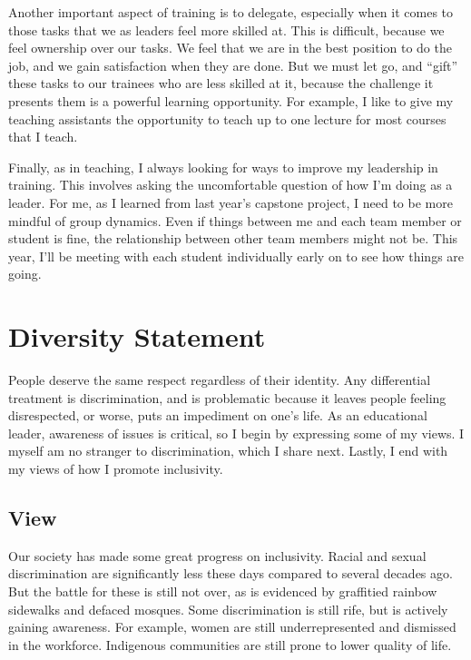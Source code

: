 \documentclass[]{article}
\begin{document}
Another important aspect of training is to delegate, especially when it comes to those tasks that we as leaders feel more skilled at. This is difficult, because we feel ownership over our tasks. We feel that we are in the best position to do the job, and we gain satisfaction when they are done. But we must let go, and ``gift'' these tasks to our trainees who are less skilled at it, because the challenge it presents them is a powerful learning opportunity. For example, I like to give my teaching assistants the opportunity to teach up to one lecture for most courses that I teach.

Finally, as in teaching, I always looking for ways to improve my leadership in training. This involves asking the uncomfortable question of how I'm doing as a leader. For me, as I learned from last year's capstone project, I need to be more mindful of group dynamics. Even if things between me and each team member or student is fine, the relationship between other team members might not be. This year, I'll be meeting with each student individually early on to see how things are going.

\hypertarget{diversity-statement}{%
\section{Diversity Statement}\label{diversity-statement}}

People deserve the same respect regardless of their identity. Any differential treatment is discrimination, and is problematic because it leaves people feeling disrespected, or worse, puts an impediment on one's life. As an educational leader, awareness of issues is critical, so I begin by expressing some of my views. I myself am no stranger to discrimination, which I share next. Lastly, I end with my views of how I promote inclusivity.

\hypertarget{view}{%
\subsection{View}\label{view}}

Our society has made some great progress on inclusivity. Racial and sexual discrimination are significantly less these days compared to several decades ago. But the battle for these is still not over, as is evidenced by graffitied rainbow sidewalks and defaced mosques. Some discrimination is still rife, but is actively gaining awareness. For example, women are still underrepresented and dismissed in the workforce. Indigenous communities are still prone to lower quality of life.
\end{document}
